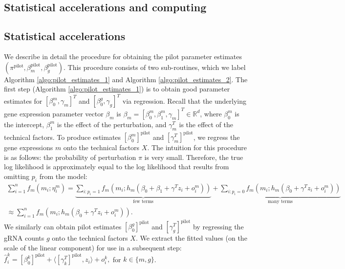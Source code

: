 \documentclass[12pt]{article}
\begin{document}
\begin{appendices}
\begin{refsection}
\section{Statistical accelerations and computing}\label{sec:statistical_accelerations}
		
\subsection{Statistical accelerations}

We describe in detail the procedure for obtaining the pilot parameter estimates $(\pi^\textrm{pilot}, \beta_m^\textrm{pilot}, \beta_g^\textrm{pilot})$. This procedure consists of two sub-routines, which we label Algorithm \ref{algo:pilot_estimates_1} and Algorithm \ref{algo:pilot_estimates_2}. The first step (Algorithm \ref{algo:pilot_estimates_1}) is to obtain good parameter estimates for $[\beta^m_0, \gamma_m]^T$ and $[\beta^g_0, \gamma_g]^T$ via regression. Recall that the underlying gene expression parameter vector $\beta_m$ is $\beta_m = [\beta^m_0, \beta^m_1, \gamma_m]^T \in \mathbb{R}^d$, where $\beta^m_0$ is the intercept, $\beta^m_1$ is the effect of the perturbation, and $\gamma_m^T$ is the effect of the technical factors. To produce estimates $[\beta^m_0]^\textrm{pilot}$ and $[\gamma_m^T]^\textrm{pilot}$, we regress the gene expressions $m$ onto the technical factors $X$. The intuition for this procedure is as follows: the probability of perturbation $\pi$ is very small. Therefore, the true log likelihood is approximately equal to the log likelihood that results from omitting $p_i$ from the model:
\begin{multline*}
\sum_{i=1}^n f_m(m_i; \eta^m_i) = \underbrace{\sum_{i : p_i =1} f_m(m_i; h_m(\beta_0 + \beta_1 + \gamma^T z_i + o^m_i))}_\textrm{few terms}  + \underbrace{\sum_{i : p_i = 0} f_m(m_i; h_m(\beta_0 + \gamma^T z_i + o^m_i))}_\textrm{many terms} \\ \approx \sum_{i = 1}^n f_m(m_i; h_m(\beta_0 + \gamma^T z_i + o^m_i)).
\end{multline*}
We similarly can obtain pilot estimates $[\beta^g_0]^\textrm{pilot}$ and $[\gamma^T_g]^\textrm{pilot}$ by regressing the gRNA counts $g$ onto the technical factors $X$. We extract the fitted values (on the scale of the linear component) for use in a subsequent step: $\hat{f}^k_i = [\beta^k_0]^\textrm{pilot} + \langle [\gamma^T_k]^\textrm{pilot}, z_i \rangle + o^k_i,$ for $k \in \{m,g\}$.


\end{refsection}
\end{appendices}
\end{document}
